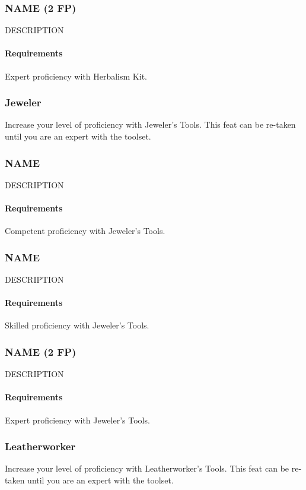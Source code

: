\subsubsection{NAME (2 FP)} \label{feat::name}
    DESCRIPTION
    \paragraph{Requirements} Expert proficiency with Herbalism Kit.
\subsubsection{Jeweler} \label{feat::jeweler}
    Increase your level of proficiency with Jeweler's Tools.
    This feat can be re-taken until you are an expert with the toolset.
\subsubsection{NAME} \label{feat::name}
    DESCRIPTION
    \paragraph{Requirements} Competent proficiency with Jeweler's Tools.
\subsubsection{NAME} \label{feat::name}
    DESCRIPTION
    \paragraph{Requirements} Skilled proficiency with Jeweler's Tools.
\subsubsection{NAME (2 FP)} \label{feat::name}
    DESCRIPTION
    \paragraph{Requirements} Expert proficiency with Jeweler's Tools.
\subsubsection{Leatherworker} \label{feat::leatherworker}
    Increase your level of proficiency with Leatherworker's Tools.
    This feat can be re-taken until you are an expert with the toolset.
